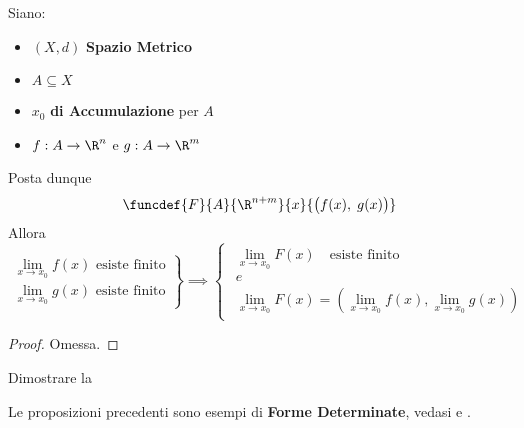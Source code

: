 \begin{proposition}
	\label{prop:lim_in_R_coord_F}
	Siano:
	\begin{itemize}[noitemsep]
		\item $(X,d)$ \textbf{Spazio Metrico}
		\item $A \subseteq X$
		\item $x_0$ \textbf{di Accumulazione} per $A$
		\item $f: A \to \R^n$ e $g: A \to \R^m$
	\end{itemize}
	Posta dunque
	\[\funcdef{F}{A}{\R^{n + m}}{x}{\bigl( f(x),\; g(x) \bigr)}\]
	Allora
	\[
		\left.
		\begin{array}{r}
			\lim\limits_{x \to x_0} f(x) \text{ esiste finito}\\
			\lim\limits_{x \to x_0} g(x) \text{ esiste finito}
		\end{array}
		\right\}
		\implies
		\begin{cases}
			\begin{array}{c}
				\lim\limits_{x \to x_0} F(x) \quad \text{esiste finito}\\
				e\\
				\lim\limits_{x \to x_0} F(x) = \left( \lim\limits_{x \to x_0} f(x), \lim\limits_{x \to x_0} g(x) \right)
			\end{array}
		\end{cases}
	\]
	\begin{proof}
		Omessa.
	\end{proof}
\end{proposition}
\begin{exercise}
	Dimostrare la 
\end{exercise}
\begin{observation}
	Le proposizioni precedenti sono esempi di \textbf{Forme Determinate}, vedasi  e .
\end{observation}

